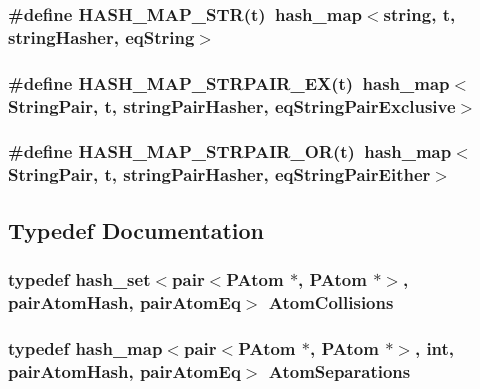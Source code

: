 \subsubsection{\setlength{\rightskip}{0pt plus 5cm}\#define HASH\_\-MAP\_\-STR(t)~hash\_\-map$<$string, t, {\bf string\-Hasher}, {\bf eq\-String}$>$}\label{PHashing_8h_5e83f1bccc0756dd754246ae4b62d6e5}


\subsubsection{\setlength{\rightskip}{0pt plus 5cm}\#define HASH\_\-MAP\_\-STRPAIR\_\-EX(t)~hash\_\-map$<${\bf String\-Pair}, t, {\bf string\-Pair\-Hasher}, {\bf eq\-String\-Pair\-Exclusive}$>$}\label{PHashing_8h_9e91bcf08d63125ec0a0880ff2c00797}


\subsubsection{\setlength{\rightskip}{0pt plus 5cm}\#define HASH\_\-MAP\_\-STRPAIR\_\-OR(t)~hash\_\-map$<${\bf String\-Pair}, t, {\bf string\-Pair\-Hasher}, {\bf eq\-String\-Pair\-Either}$>$}\label{PHashing_8h_e5a041977f8308e3af366b4405d0ea23}




\subsection{Typedef Documentation}
\subsubsection{\setlength{\rightskip}{0pt plus 5cm}typedef hash\_\-set$<$pair$<${\bf PAtom} $\ast$, {\bf PAtom} $\ast$$>$, {\bf pair\-Atom\-Hash}, {\bf pair\-Atom\-Eq}$>$ {\bf Atom\-Collisions}}\label{PHashing_8h_78d70d02661621c1f2aaf7b64fe12595}


\subsubsection{\setlength{\rightskip}{0pt plus 5cm}typedef hash\_\-map$<$pair$<${\bf PAtom} $\ast$, {\bf PAtom} $\ast$$>$, int, {\bf pair\-Atom\-Hash}, {\bf pair\-Atom\-Eq}$>$ {\bf Atom\-Separations}}\label{PHashing_8h_20f0b2ba64218d85f5a887e39d0a8631}


